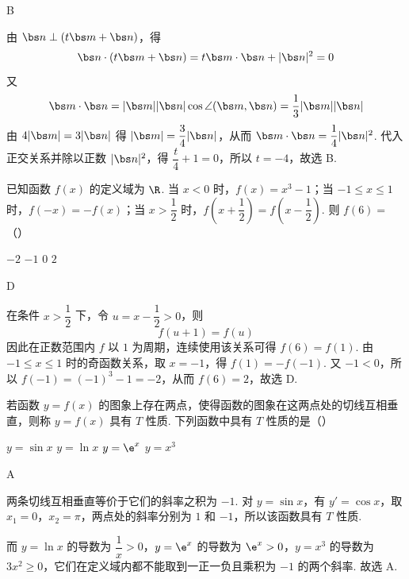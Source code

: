 \begin{answer}
B
\end{answer}

\begin{solution}
由 \(\bs n\perp(t\bs m+\bs n)\)，得
\[
\bs n\cdot(t\bs m+\bs n)=t\bs m\cdot\bs n+|\bs n|^2=0
\]
又
\[
\bs m\cdot\bs n=|\bs m||\bs n|\cos\angle(\bs m,\bs n)=\frac13|\bs m||\bs n|
\]
由 \(4|\bs m|=3|\bs n|\) 得 \(|\bs m|=\dfrac34|\bs n|\)，从而 \(\bs m\cdot\bs n=\dfrac14|\bs n|^2\). 代入正交关系并除以正数 \(|\bs n|^2\)，得 \(\dfrac t4+1=0\)，所以 \(t=-4\)，故选 B.
\end{solution}

\begin{problem}
已知函数 \(f(x)\) 的定义域为 \(\R\). 当 \(x<0\) 时，\(f(x)=x^3-1\)；当 \(-1\le x\le 1\) 时，\(f(-x)=-f(x)\)；当 \(x>\dfrac12\) 时，\(f\left(x+\dfrac12\right)=f\left(x-\dfrac12\right)\). 则 \(f(6)=\)（\quad）

\choices
    {\(-2\)}
    {\(-1\)}
    {\(0\)}
    {\(2\)}
\end{problem}

\begin{answer}
D
\end{answer}

\begin{solution}
在条件 \(x>\dfrac12\) 下，令 \(u=x-\dfrac12>0\)，则
\[
f(u+1)=f(u)
\]
因此在正数范围内 \(f\) 以 \(1\) 为周期，连续使用该关系可得 \(f(6)=f(1)\). 由 \(-1\leq x\leq1\) 时的奇函数关系，取 \(x=-1\)，得 \(f(1)=-f(-1)\). 又 \(-1<0\)，所以 \(f(-1)=(-1)^3-1=-2\)，从而 \(f(6)=2\)，故选 D.
\end{solution}

\begin{problem}
若函数 \(y=f(x)\) 的图象上存在两点，使得函数的图象在这两点处的切线互相垂直，则称 \(y=f(x)\) 具有 \(T\) 性质. 下列函数中具有 \(T\) 性质的是（\quad）

\choices
    {\(y=\sin x\)}
    {\(y=\ln x\)}
    {\(y=\e^x\)}
    {\(y=x^3\)}
\end{problem}

\begin{answer}
A
\end{answer}

\begin{solution}
两条切线互相垂直等价于它们的斜率之积为 \(-1\). 对 \(y=\sin x\)，有 \(y'=\cos x\)，取 \(x_1=0\)，\(x_2=\pi\)，两点处的斜率分别为 \(1\) 和 \(-1\)，所以该函数具有 \(T\) 性质.

而 \(y=\ln x\) 的导数为 \(\dfrac1x>0\)，\(y=\e^x\) 的导数为 \(\e^x>0\)，\(y=x^3\) 的导数为 \(3x^2\geq0\)，它们在定义域内都不能取到一正一负且乘积为 \(-1\) 的两个斜率. 故选 A.
\end{solution}

